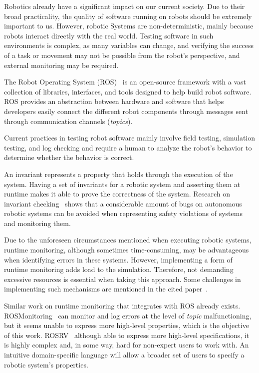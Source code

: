\documentclass[runningheads]{llncs}
\begin{document}
Robotics already have a significant impact on our current society. Due to their broad practicality, the quality of software running on robots should be extremely important to us. However, robotic Systems are non-deterministic, mainly because robots interact directly with the real world. Testing software in such environments is complex, as many variables can change, and verifying the success of a task or movement may not be possible from the robot's perspective, and external monitoring may be required.

The Robot Operating System (ROS)~\cite{quigley2009ros} is an open-source framework with a vast collection of libraries, interfaces, and tools designed to help build robot software. ROS provides an abstraction between hardware and software that helps developers easily connect the different robot components through messages sent through communication channels (\textit{topics}).

Current practices in testing robot software mainly involve field testing, simulation testing, and log checking and require a human to analyze the robot's behavior to determine whether the behavior is correct.

An invariant represents a property that holds through the execution of the system. Having a set of invariants for a robotic system and asserting them at runtime makes it able to prove the correctness of the system. Research on invariant checking~\cite{zizyte2021importance} shows that a considerable amount of bugs on autonomous robotic systems can be avoided when representing safety violations of systems and monitoring them.

Due to the unforeseen circumstances mentioned when executing robotic systems, runtime monitoring, although sometimes time-consuming, may be advantageous when identifying errors in these systems. However, implementing a form of runtime monitoring adds load to the simulation. Therefore, not demanding excessive resources is essential when taking this approach. Some challenges in implementing such mechanisms are mentioned in the cited paper~\cite{stadler2022towards}.

Similar work on runtime monitoring that integrates with ROS already exists. ROSMonitoring~\cite{ferrando2020rosmonitoring} can monitor and log errors at the level of \textit{topic} malfunctioning, but it seems unable to express more high-level properties, which is the objective of this work. ROSRV~\cite{huang2014rosrv} although able to express more high-level specifications, it is highly complex and, in some way, hard for non-expert users to work with. An intuitive domain-specific language will allow a broader set of users to specify a robotic system's properties.
\end{document}
